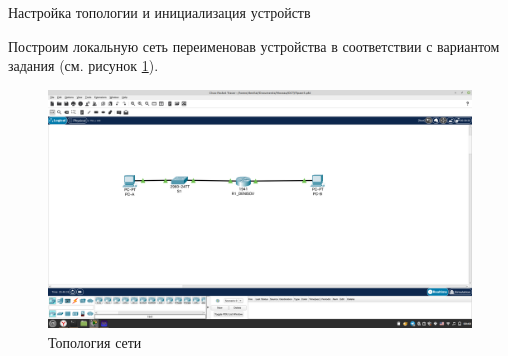\documentclass[a4paper,14pt]{extarticle}
\begin{document}
\begin{mypart}{Настройка топологии и инициализация устройств}

Построим локальную сеть переименовав устройства в соответствии с вариантом задания (см. рисунок \ref{fig:pract5-topology}).

\begin{figure}[htbp]
	\centering
	\includegraphics[width=0.5\linewidth]{images/pract5-topology}
	\caption{Топология сети}
	\label{fig:pract5-topology}
\end{figure}
\end{mypart}
\newpage
\end{document}
